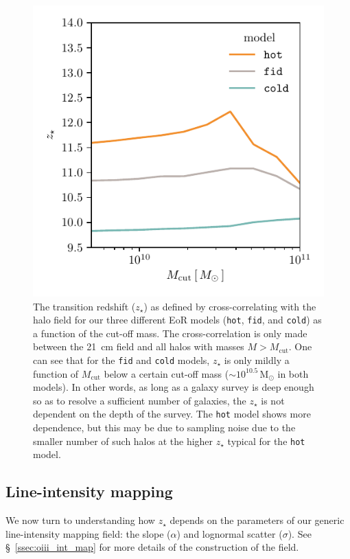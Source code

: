 \documentclass[a4paper,fleqn,usenatbib]{mnras}
\newcommand{\Msun}{\ensuremath{\text{M}_\odot}}
\newcommand{\fid}{\texttt{fid}}
\newcommand{\hot}{\texttt{hot}}
\newcommand{\cold}{\texttt{cold}}
\newcommand{\zst}{\ensuremath{z_{\star}}}
\begin{document}
\begin{figure}
\includegraphics[width=\columnwidth]{plots/ztran_vs_Mcut.pdf}
\caption{The transition redshift (\zst) as defined by cross-correlating with
the halo field for our three different EoR models (\hot{}, \fid{}, and
\cold{}) as a function of the cut-off mass. The cross-correlation is only made
between the 21~cm field and all halos with masses $M>M_{\text{cut}}$. One can
see that for the \fid{} and \cold{} models, \zst{} is only mildly a function
of $M_{\text{cut}}$ below a certain cut-off mass ($\sim10^{10.5}\,\Msun$ in
both models). In other words, as long as a galaxy survey is deep enough so as
to resolve a sufficient number of galaxies, the \zst{} is not dependent on the
depth of the survey. The \hot{} model shows more dependence, but this may be
due to sampling noise due to the smaller number of such halos at the higher
\zst{} typical for the \hot{} model.}
\end{figure}

\subsection{Line-intensity mapping} \label{ssec:lim}
We now turn to understanding how \zst{} depends on the parameters of our
generic line-intensity mapping field: the slope ($\alpha$) and lognormal
scatter ($\sigma$). See \S~\ref{ssec:oiii_int_map} for more details of the
construction of the field.
\end{document}
